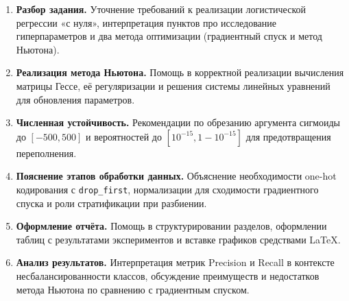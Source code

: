 \documentclass[12pt,a4paper]{article}
\begin{document}
\begin{enumerate}
    \item \textbf{Разбор задания.} Уточнение требований к реализации
          логистической регрессии «с нуля», интерпретация пунктов
          про исследование гиперпараметров и два метода оптимизации
          (градиентный спуск и метод Ньютона).
    \item \textbf{Реализация метода Ньютона.} Помощь в корректной
          реализации вычисления матрицы Гессе, её регуляризации и
          решения системы линейных уравнений для обновления параметров.
    \item \textbf{Численная устойчивость.} Рекомендации по обрезанию
          аргумента сигмоиды до \([-500, 500]\) и вероятностей до
          \([10^{-15}, 1 - 10^{-15}]\) для предотвращения переполнения.
    \item \textbf{Пояснение этапов обработки данных.} Объяснение
          необходимости one-hot кодирования с \texttt{drop\_first},
          нормализации для сходимости градиентного спуска и роли
          стратификации при разбиении.
    \item \textbf{Оформление отчёта.} Помощь в структурировании
          разделов, оформлении таблиц с результатами экспериментов
          и вставке графиков средствами \LaTeX{}.
    \item \textbf{Анализ результатов.} Интерпретация метрик Precision
          и Recall в контексте несбалансированности классов,
          обсуждение преимуществ и недостатков метода Ньютона по
          сравнению с градиентным спуском.
\end{enumerate}

\end{document}
